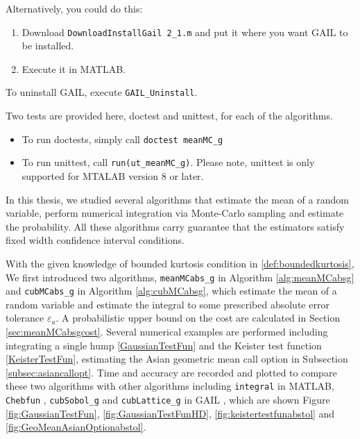 \documentclass{iitthesis}
\theoremstyle{definition}
\begin{document}
Alternatively, you could do this:
\begin{enumerate}
\item Download {\tt DownloadInstallGail 2\_1.m} and put it where you want GAIL to be installed.
\item Execute it in MATLAB.
\end{enumerate}

To uninstall GAIL, execute {\tt GAIL\_Uninstall}.

Two tests are provided here, doctest and unittest, for each of the algorithms.
\begin{itemize}
\item To run doctests, simply call {\tt doctest meanMC\_g}
\item To run unittest, call {\tt run(ut\_meanMC\_g)}. Please note, unittest is only supported for MTALAB version 8 or later.
\end{itemize}


\label{chapter:comclusion}

In this thesis, we studied several algorithms that estimate the mean of a random variable, perform numerical integration via Monte-Carlo sampling and estimate the probability. All these algorithms carry guarantee that the estimators satisfy fixed width confidence interval conditions.

With the given knowledge of bounded kurtosis condition in \eqref{def:boundedkurtosis}, We first introduced two algorithms, {\tt meanMCabs\_g} in Algorithm \ref{alg:meanMCabsg} and {\tt cubMCabs\_g} in Algorithm \ref{alg:cubMCabsg}, which estimate the mean of a random variable and estimate the integral to some prescribed absolute error tolerance $\varepsilon_a$. A probabilistic upper bound on the cost are calculated in Section \ref{sec:meanMCabsgcost}. Several numerical examples are performed including integrating a single hump \eqref{GaussianTestFun} and the Keister test function \eqref{KeisterTestFun}, estimating the Asian geometric mean call option in Subsection \ref{subsec:asiancallopt}. Time and accuracy are recorded and plotted to compare these two algorithms with other algorithms including {\tt integral} in MATLAB, {\tt Chebfun} \cite{Chebfun14}, {\tt cubSobol\_g} and {\tt cubLattice\_g} in GAIL \cite{GAIL_2_1}, which are shown Figure \ref{fig:GaussianTestFun}, \ref{fig:GaussianTestFunHD}, \ref{fig:keistertestfunabstol} and \ref{fig:GeoMeanAsianOptionabstol}.
\end{document}
